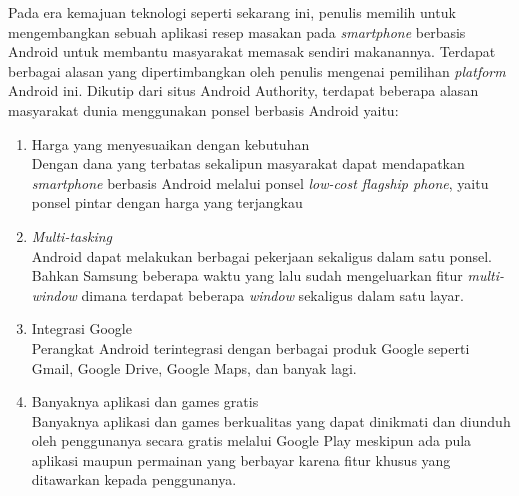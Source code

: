 Pada era kemajuan teknologi seperti sekarang ini, penulis memilih untuk mengembangkan sebuah aplikasi resep masakan pada \textit{smartphone} berbasis Android untuk membantu masyarakat memasak sendiri makanannya. Terdapat berbagai alasan yang dipertimbangkan oleh penulis mengenai pemilihan \textit{platform} Android ini. Dikutip dari situs Android Authority, terdapat beberapa alasan masyarakat dunia menggunakan ponsel berbasis Android yaitu:
\begin{enumerate}
	\item Harga yang menyesuaikan dengan kebutuhan\\
	Dengan dana yang terbatas sekalipun masyarakat dapat mendapatkan \textit{smartphone} berbasis Android melalui ponsel \emph{low-cost flagship phone}, yaitu ponsel pintar dengan harga yang terjangkau
	\item \emph{Multi-tasking}\\
	Android dapat melakukan berbagai pekerjaan sekaligus dalam satu ponsel. Bahkan Samsung beberapa waktu yang lalu sudah mengeluarkan fitur \emph{multi-window} dimana terdapat beberapa \emph{window} sekaligus dalam satu layar.
	\item Integrasi Google\\
	Perangkat Android terintegrasi dengan berbagai produk Google seperti Gmail, Google Drive, Google Maps, dan banyak lagi. 
	\item Banyaknya aplikasi dan games gratis\\
	Banyaknya aplikasi dan games berkualitas yang dapat dinikmati dan diunduh oleh penggunanya secara gratis melalui Google Play meskipun ada pula aplikasi maupun permainan yang berbayar karena fitur khusus yang ditawarkan kepada penggunanya.
\end{enumerate}

